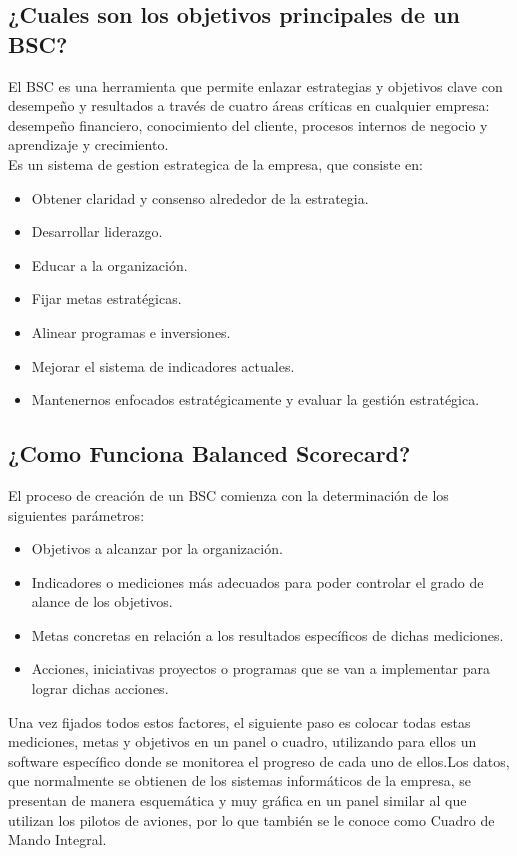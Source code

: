 \documentclass[%
 reprint,
 amsmath,amssymb,
 aps,
]{revtex4-1}
\begin{document}
\subsection{¿Cuales son los objetivos principales de un BSC?}
El BSC es una herramienta que permite enlazar estrategias y objetivos clave con desempeño y resultados a través de cuatro áreas críticas en cualquier empresa: desempeño financiero, conocimiento del cliente, procesos internos de negocio y aprendizaje y crecimiento.\cite{bs}\\
Es un sistema de gestion estrategica de la empresa, que consiste en:
\begin{itemize}
\item Obtener claridad y consenso alrededor de la estrategia.\\
\item Desarrollar liderazgo.  \\
\item Educar a la organización.\\
\item Fijar metas estratégicas. \\
\item Alinear programas e inversiones.\\
\item Mejorar el sistema de indicadores actuales.\\
\item Mantenernos enfocados estratégicamente y evaluar la gestión estratégica. \\

\end{itemize}


\subsection{¿Como Funciona Balanced Scorecard?}

El proceso de creación de un BSC comienza con la determinación de los siguientes parámetros:
\begin{itemize}
\item Objetivos a alcanzar por la organización. \\
\item Indicadores o mediciones más adecuados para poder controlar el grado de alance de los objetivos. \\
\item Metas concretas en relación a los resultados específicos de dichas mediciones.  \\
\item Acciones, iniciativas proyectos o programas que se van a implementar para lograr dichas acciones.\\
\end{itemize}
Una vez fijados todos estos factores, el siguiente paso es colocar todas estas mediciones, metas y objetivos en un panel o cuadro, utilizando para ellos un software específico donde se monitorea el progreso de cada uno de ellos.Los datos, que normalmente se obtienen de los sistemas informáticos de la empresa, se presentan de manera esquemática y muy gráfica en un panel similar al que utilizan los pilotos de aviones, por lo que también se le conoce como Cuadro de Mando Integral.\cite{bs}\\
\end{document}
